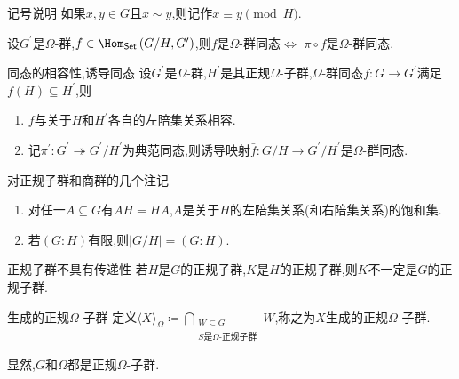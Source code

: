 \begin{remark}{记号说明}{}
	如果$x,y\in G$且$x\sim y$,则记作$x\equiv y \pmod{H}$.
\end{remark}

\begin{proposition}{}{}
	设$G^{\prime}$是$\Omega$-群,$f\in\Hom_{\mathsf{Set}}\left(G/H,G^{\prime}\right)$,则$f$是$\Omega$-群同态$\iff$ $\pi\circ f$是$\Omega$-群同态.
\end{proposition}

\begin{proposition}{同态的相容性,诱导同态}{}
	设$G^{\prime}$是$\Omega$-群,$H^{\prime}$是其正规$\Omega$-子群,$\Omega$-群同态$f:G\to G^{\prime}$满足$f\left(H\right)\subseteq H^{\prime}$,则
	\begin{enumerate}
		\item $f$与关于$H$和$H^{\prime}$各自的左陪集关系相容.
		\item 记$\pi^{\prime}:G^{\prime}\twoheadrightarrow G^{\prime}/H^{\prime}$为典范同态,则诱导映射$\bar{f}:G/H\to G^{\prime}/H^{\prime}$是$\Omega$-群同态.
	\end{enumerate}
\end{proposition}

\begin{remark}{对正规子群和商群的几个注记}{}
	\begin{enumerate}
		\item 对任一$A\subseteq G$有$AH=HA$,$A$是关于$H$的左陪集关系(和右陪集关系)的饱和集.
		\item 若$\left(G:H\right)$有限,则$\left|G/H\right|=\left(G:H\right)$.
	\end{enumerate}
\end{remark}

\begin{remark}{正规子群不具有传递性}{}
	若$H$是$G$的正规子群,$K$是$H$的正规子群,则$K$不一定是$G$的正规子群.
\end{remark}

\begin{definition}{生成的正规$\Omega$-子群}{}
	定义$\langle X\rangle_{\Omega}\coloneq\bigcap\limits_{\substack{W\subseteq G\\S\text{是}\Omega\text{-正规子群}}}W$,称之为$X$生成的正规$\Omega$-子群.
\end{definition}

显然,$G$和$\Omega$都是正规$\Omega$-子群.

